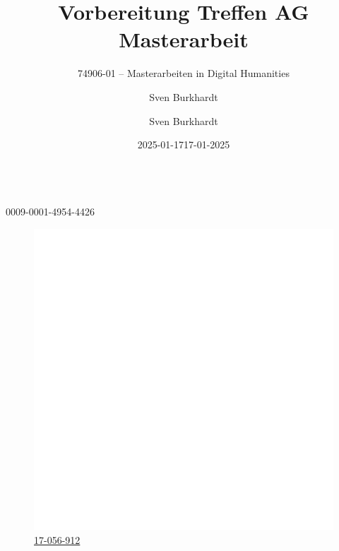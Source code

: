 \documentclass[12pt, a4paper, ngerman, bidi=default]{article}
\title{\vspace*{4cm}\Huge{Vorbereitung Treffen AG Masterarbeit}}
\subtitle {\large 74906-01 – Masterarbeiten in Digital Humanities}
\author{Sven Burkhardt}
\date{2025-01-17}
\begin{document}
\begin{titlepage}
    
\color{white}
\pagecolor[HTML]{46505A } %
\date{}
\author{}
\maketitle
\begin{center}
  \author{\LARGE{\author{\vspace{-0.5cm}Sven Burkhardt}}}\\
  \vspace{4mm}
  \large{ {0009-0001-4954-4426}}\\ %
  \begin{figure}[h]
    \centering
    \color{white}
    \large{\href{https://dhlab.philhist.unibas.ch/en/persons/sven-burkhardt/}{{\hspace*{0.5mm}\includegraphics[height=4.5
  mm]{./assets/Logos/Uni_basel_logo_white.png}}\hspace{3.4mm}\color{white} 17-056-912}}\\ %
    
    \date{\hspace*{2mm}17-01-2025}
  \end{figure}
  \setcounter{figure}{0}
\end{center}



\end{titlepage}
\end{document}
